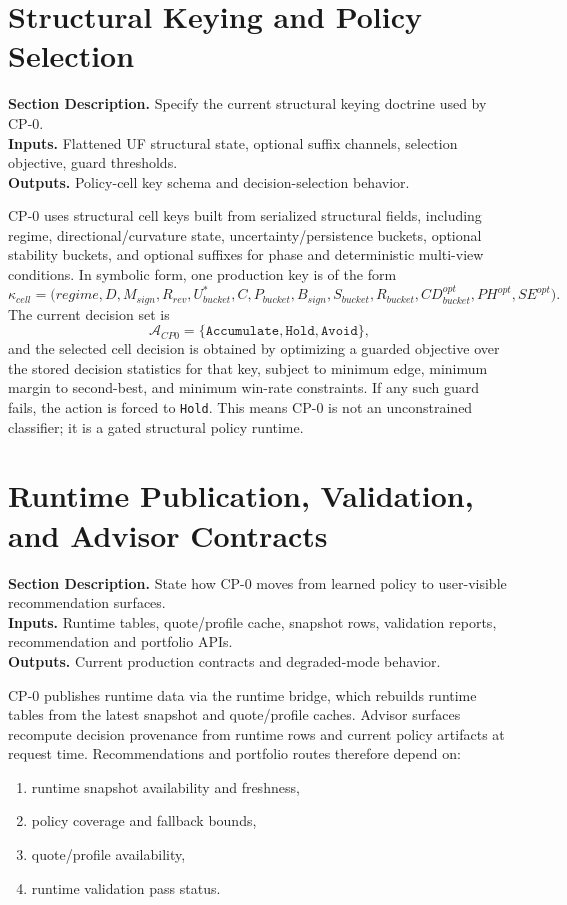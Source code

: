 \documentclass[11pt]{report}
\newcommand{\meta}[3]{\textbf{Section Description.} #1\\
\textbf{Inputs.} #2\\
\textbf{Outputs.} #3\par}
\begin{document}
\section{Structural Keying and Policy Selection}
\meta{Specify the current structural keying doctrine used by CP-0.}{Flattened UF structural state, optional suffix channels, selection objective, guard thresholds.}{Policy-cell key schema and decision-selection behavior.}

CP-0 uses structural cell keys built from serialized structural fields, including regime, directional/curvature state, uncertainty/persistence buckets, optional stability buckets, and optional suffixes for phase and deterministic multi-view conditions. In symbolic form, one production key is of the form
\[
\kappa_{cell}=\big(regime, D, M_{sign}, R_{rev}, U^{\ast}_{bucket}, C, P_{bucket}, B_{sign}, S_{bucket}, R_{bucket}, CD_{bucket}^{opt}, PH^{opt}, SE^{opt}\big).
\]
The current decision set is
\[
\mathcal{A}_{CP0}=\{\texttt{Accumulate},\texttt{Hold},\texttt{Avoid}\},
\]
and the selected cell decision is obtained by optimizing a guarded objective over the stored decision statistics for that key, subject to minimum edge, minimum margin to second-best, and minimum win-rate constraints. If any such guard fails, the action is forced to \texttt{Hold}. This means CP-0 is not an unconstrained classifier; it is a gated structural policy runtime.

\section{Runtime Publication, Validation, and Advisor Contracts}
\meta{State how CP-0 moves from learned policy to user-visible recommendation surfaces.}{Runtime tables, quote/profile cache, snapshot rows, validation reports, recommendation and portfolio APIs.}{Current production contracts and degraded-mode behavior.}

CP-0 publishes runtime data via the runtime bridge, which rebuilds runtime tables from the latest snapshot and quote/profile caches. Advisor surfaces recompute decision provenance from runtime rows and current policy artifacts at request time. Recommendations and portfolio routes therefore depend on:
\begin{enumerate}[leftmargin=1.2cm]
    \item runtime snapshot availability and freshness,
    \item policy coverage and fallback bounds,
    \item quote/profile availability,
    \item runtime validation pass status.
\end{enumerate}
\end{document}
